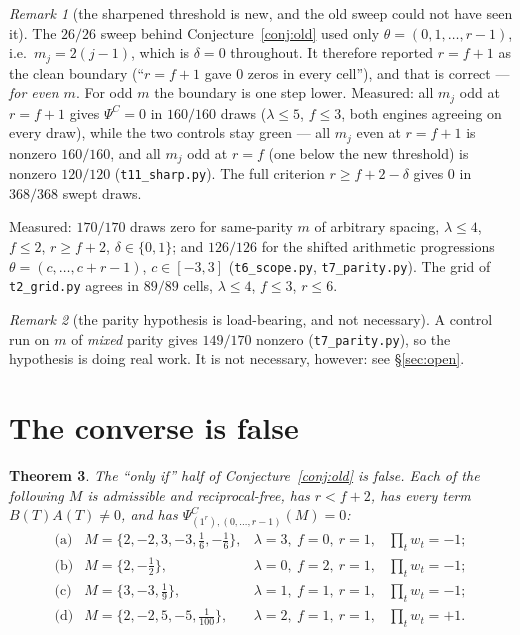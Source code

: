 \documentclass[11pt]{article}
\newtheorem{theorem}{Theorem}
\theoremstyle{definition}
\theoremstyle{remark}
\newtheorem{remark}[theorem]{Remark}
\newcommand{\PsiC}{\Psi^{C}}
\newcommand{\bftheta}{\theta}
\begin{document}
\begin{remark}[the sharpened threshold is new, and the old sweep could not have seen it]
The $26/26$ sweep behind Conjecture~\ref{conj:old} used only
$\bftheta=(0,1,\dots,r-1)$, i.e.\ $m_j=2(j-1)$, which is $\delta=0$ throughout. It
therefore reported $r=f+1$ as the clean boundary (``$r=f+1$ gave $0$ zeros in every
cell''), and that is correct --- \emph{for even $m$}. For odd $m$ the boundary is one
step lower. Measured: all $m_j$ odd at $r=f+1$ gives $\PsiC=0$ in $160/160$ draws
($\lambda\le5$, $f\le3$, both engines agreeing on every draw), while the two controls
stay green --- all $m_j$ even at $r=f+1$ is nonzero $160/160$, and all $m_j$ odd at
$r=f$ (one below the new threshold) is nonzero $120/120$ (\texttt{t11\_sharp.py}). The
full criterion $r\ge f+2-\delta$ gives $0$ in $368/368$ swept draws.
\end{remark}

Measured: $170/170$ draws zero for same-parity $m$ of arbitrary spacing, $\lambda\le4$,
$f\le2$, $r\ge f+2$, $\delta\in\{0,1\}$; and $126/126$ for the shifted arithmetic
progressions $\bftheta=(c,\dots,c+r-1)$, $c\in[-3,3]$ (\texttt{t6\_scope.py},
\texttt{t7\_parity.py}). The grid of \texttt{t2\_grid.py} agrees in $89/89$ cells,
$\lambda\le4$, $f\le3$, $r\le6$.

\begin{remark}[the parity hypothesis is load-bearing, and not necessary]
\label{rem:parity}
A control run on $m$ of \emph{mixed} parity gives $149/170$ nonzero
(\texttt{t7\_parity.py}), so the hypothesis is doing real work. It is not necessary,
however: see \S\ref{sec:open}.
\end{remark}

\section{The converse is false}

\begin{theorem}\label{thm:refute}
The ``only if'' half of Conjecture~\ref{conj:old} is false. Each of the following $M$ is
admissible and reciprocal-free, has $r<f+2$, has every term $B(T)A(T)\neq0$, and has
$\PsiC_{(1^r),(0,\dots,r-1)}(M)=0$:
\[
\begin{array}{llll}
  \text{(a)} & M=\{2,-2,3,-3,\tfrac16,-\tfrac16\}, & \lambda=3,\ f=0,\ r=1, & \textstyle\prod_t w_t=-1;\\
  \text{(b)} & M=\{2,-\tfrac12\}, & \lambda=0,\ f=2,\ r=1, & \textstyle\prod_t w_t=-1;\\
  \text{(c)} & M=\{3,-3,\tfrac19\}, & \lambda=1,\ f=1,\ r=1, & \textstyle\prod_t w_t=-1;\\
  \text{(d)} & M=\{2,-2,5,-5,\tfrac1{100}\}, & \lambda=2,\ f=1,\ r=1, & \textstyle\prod_t w_t=+1.
\end{array}
\]
\end{theorem}
\end{document}
